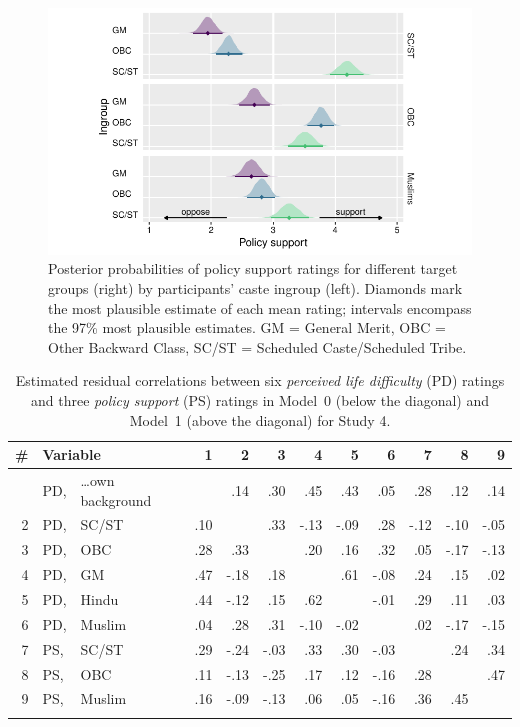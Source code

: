 \documentclass[12pt, a4paper]{article}
\begin{document}
\begin{figure}
\centering
\includegraphics[scale=1]{../figures/figure-8}
\caption{
Posterior probabilities of policy support ratings for different target groups (right) by participants' caste ingroup (left). Diamonds mark the most plausible estimate of each mean rating; intervals encompass the 97\% most plausible estimates. GM = General Merit, OBC = Other Backward Class, SC/ST = Scheduled Caste/Scheduled Tribe.
}
\label{fig:d-2}
\end{figure}

\begin{table}
\centering
{}
\caption[Estimated residual correlations in Models 0 and 1 for Study 4]{Estimated residual correlations between six \emph{perceived life difficulty} (PD) ratings and three \emph{policy support} (PS) ratings in Model~0 (below the diagonal) and Model~1 (above the diagonal) for Study 4.}
\small	
\begin{tabularx}{\linewidth}{rl@{~}Xrrrrrr|rrr} \toprule
\# & \multicolumn{2}{l}{Variable} & 1 & 2 & 3 & 4 & 5 & 6 & 7 & 8 & 9 \\ \midrule \addlinespace
1 & PD, & \ldots own background & \textbf{}  & .14 & .30 & .45 & .43 & .05 & .28 & .12 & .14 \\
2 & PD, & SC/ST  & .10 & \textbf{} & .33 & -.13 & -.09 & .28 & -.12 & -.10 & -.05 \\
3 & PD, & OBC    & .28 & .33 & \textbf{} & .20 & .16 & .32 & .05 & -.17 & -.13  \\
4 & PD, & GM     & .47 & -.18 & .18 & \textbf{} & .61 & -.08 & .24 & .15 & .02 \\
5 & PD, & Hindu  & .44 & -.12 & .15 & .62 & \textbf{} & -.01 & .29 & .11 & .03  \\
6 & PD, & Muslim & .04 & .28 & .31 & -.10 & -.02 & \textbf{} & .02 & -.17 & -.15 \\ \midrule
7 & PS, & SC/ST  & .29 & -.24 & -.03 & .33 & .30 & -.03 & \textbf{} & .24 & .34 \\
8 & PS, & OBC    & .11 & -.13 & -.25 & .17 & .12 & -.16 & .28 & \textbf{} & .47 \\
9 & PS, & Muslim & .16 & -.09 & -.13 & .06 & .05 & -.16 & .36 & .45 & \textbf{}   \\ \addlinespace \bottomrule
\end{tabularx}
\label{tab:d-1}
\end{table}
\end{document}

